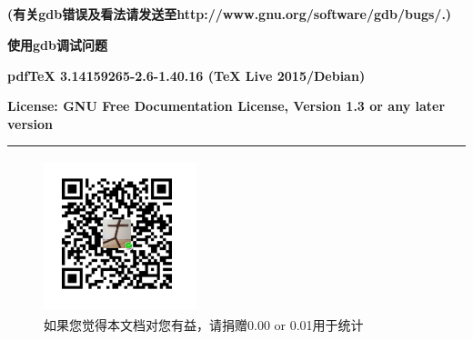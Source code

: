 \documentclass[class=book, crop=false]{standalone}
\begin{document}
\begin{CJK}{UTF8}{gbsn}
\chapter*{}
\raggedleft
{\bfseries\small (有关gdb错误及看法请发送至http://www.gnu.org/software/gdb/bugs/.)} \par
{\bfseries\small 使用gdb调试问题} \par
{\bfseries\small pdfTeX 3.14159265-2.6-1.40.16 (TeX Live 2015/Debian)} \par
\begingroup
\fontsize{68pt}{320pt}\selectfont
\vspace{2ex}
\centering
\raggedright
{\bfseries\small License: GNU Free Documentation License, Version 1.3 or any later version} \par
\rule{\textwidth}{1mm}
\endgroup
\begin{figure} 
\raggedright
\includegraphics[width=1.75in,height=1.75in]{donate}
\caption*{如果您觉得本文档对您有益，请捐赠0.00 or 0.01用于统计}
\end{figure}
\cleardoublepage
\end{CJK}
\end{document}
